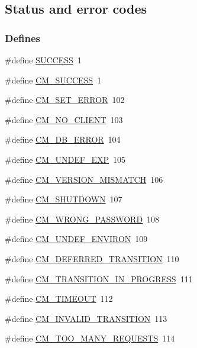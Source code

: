 \subsection{Status and error codes}
\label{group__err21}
\subsubsection*{Defines}
\begin{DoxyCompactItemize}
\item 
\#define \hyperlink{group__err21_gaa90cac659d18e8ef6294c7ae337f6b58}{SUCCESS}~1
\item 
\#define \hyperlink{group__err21_ga0180947941230d805f5dbb6f1801c17c}{CM\_\-SUCCESS}~1
\item 
\#define \hyperlink{group__err21_ga2559211d26add70c0fdc21958ed0e9e1}{CM\_\-SET\_\-ERROR}~102
\item 
\#define \hyperlink{group__err21_gaae1164bcc7a30753d96723b897ce234e}{CM\_\-NO\_\-CLIENT}~103
\item 
\#define \hyperlink{group__err21_gad7158e389b0aa1f99cb40adb80b2bace}{CM\_\-DB\_\-ERROR}~104
\item 
\#define \hyperlink{group__err21_ga10f9c3f1a23d0f63f86edf36143c849d}{CM\_\-UNDEF\_\-EXP}~105
\item 
\#define \hyperlink{group__err21_gae706ef5a8d5795d01ba8fa67d6db6302}{CM\_\-VERSION\_\-MISMATCH}~106
\item 
\#define \hyperlink{group__err21_ga76db0fac26b6f3dcdc29ec8b640c5a5f}{CM\_\-SHUTDOWN}~107
\item 
\#define \hyperlink{group__err21_ga9a26da1c28eadf3f46a335b41520ecd8}{CM\_\-WRONG\_\-PASSWORD}~108
\item 
\#define \hyperlink{group__err21_gaf3ff2980ad033cdeb6ed0bb53dfec41c}{CM\_\-UNDEF\_\-ENVIRON}~109
\item 
\#define \hyperlink{group__err21_ga56216c4157257715878749974191b697}{CM\_\-DEFERRED\_\-TRANSITION}~110
\item 
\#define \hyperlink{group__err21_ga5eb422d9ad83d53c886a16a4691e7eb4}{CM\_\-TRANSITION\_\-IN\_\-PROGRESS}~111
\item 
\#define \hyperlink{group__err21_ga3f98d4cb53674e51840088d7c8435d85}{CM\_\-TIMEOUT}~112
\item 
\#define \hyperlink{group__err21_ga23fd8fcf5d790b87dd9d8a77e263a2d4}{CM\_\-INVALID\_\-TRANSITION}~113
\item 
\#define \hyperlink{group__err21_ga651caeed4e07732c8ce40c41c69ba9a2}{CM\_\-TOO\_\-MANY\_\-REQUESTS}~114
\end{DoxyCompactItemize}


